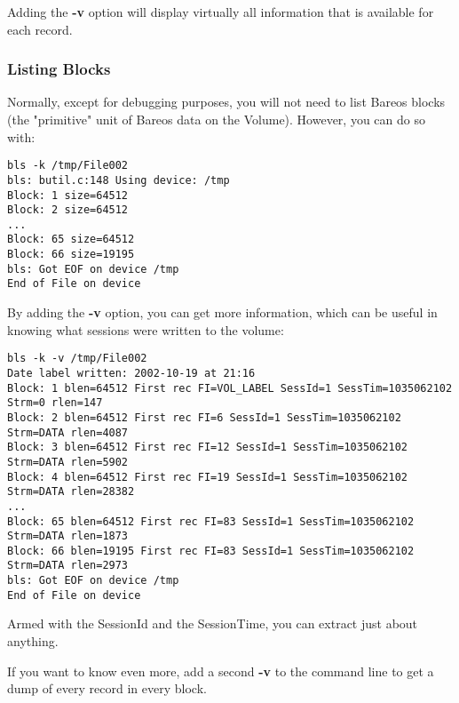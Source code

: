 Adding the {\bf -v} option will display virtually all information that is
available for each record.

\subsubsection{Listing Blocks}

Normally, except for debugging purposes, you will not need to list Bareos
blocks (the "primitive" unit of Bareos data on the Volume). However, you can
do so with:

\footnotesize
\begin{verbatim}
bls -k /tmp/File002
bls: butil.c:148 Using device: /tmp
Block: 1 size=64512
Block: 2 size=64512
...
Block: 65 size=64512
Block: 66 size=19195
bls: Got EOF on device /tmp
End of File on device
\end{verbatim}
\normalsize

By adding the {\bf -v} option, you can get more information, which can be
useful in knowing what sessions were written to the volume:

\footnotesize
\begin{verbatim}
bls -k -v /tmp/File002
Date label written: 2002-10-19 at 21:16
Block: 1 blen=64512 First rec FI=VOL_LABEL SessId=1 SessTim=1035062102 Strm=0 rlen=147
Block: 2 blen=64512 First rec FI=6 SessId=1 SessTim=1035062102 Strm=DATA rlen=4087
Block: 3 blen=64512 First rec FI=12 SessId=1 SessTim=1035062102 Strm=DATA rlen=5902
Block: 4 blen=64512 First rec FI=19 SessId=1 SessTim=1035062102 Strm=DATA rlen=28382
...
Block: 65 blen=64512 First rec FI=83 SessId=1 SessTim=1035062102 Strm=DATA rlen=1873
Block: 66 blen=19195 First rec FI=83 SessId=1 SessTim=1035062102 Strm=DATA rlen=2973
bls: Got EOF on device /tmp
End of File on device
\end{verbatim}
\normalsize

Armed with the SessionId and the SessionTime, you can extract just about
anything.

If you want to know even more, add a second {\bf -v} to the command line to
get a dump of every record in every block.

